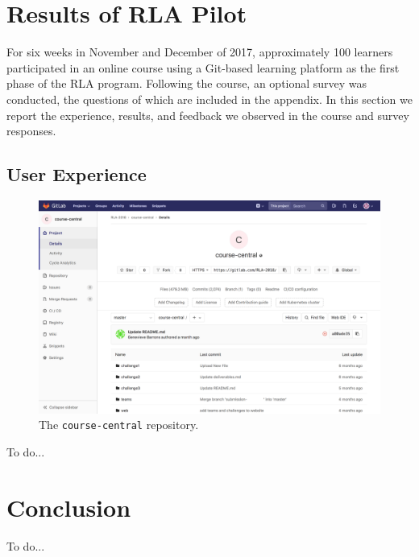 \documentclass[12pt,twoside,vi]{mitthesis}
\newcommand{\wip}[1]{{\color{red} To do...}}
\begin{document}
\chapter{Results of RLA Pilot}

For six weeks in November and December of 2017, approximately 100 learners participated in an online course using a Git-based learning platform as the first phase of the RLA program. Following the course, an optional survey was conducted, the questions of which are included in the appendix. In this section we report the experience, results, and feedback we observed in the course and survey responses.

\section{User Experience}

\begin{figure}[H]
\centering
\includegraphics[scale=0.3]{fig-course-central.png}
\caption{The \texttt{course-central} repository.}
\end{figure}

\wip{Frame around tensions, for each broad set of interactions go over "what did it look like", "how did it work", and "how well did it work"}

\chapter{Conclusion}

\wip{narrative summary of thesis, an honest set of personal takeaways (from which reader can judge whether to replicate work) and feeligns about future work}

\appendix
\end{document}
